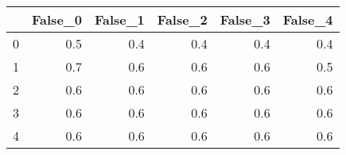 \begin{tabular}{lrrrrr}
\toprule
{} &  False\_0 &  False\_1 &  False\_2 &  False\_3 &  False\_4 \\ \hline
\midrule
0 &      0.5 &      0.4 &      0.4 &      0.4 &      0.4 \\ \hline
1 &      0.7 &      0.6 &      0.6 &      0.6 &      0.5 \\ \hline
2 &      0.6 &      0.6 &      0.6 &      0.6 &      0.6 \\ \hline
3 &      0.6 &      0.6 &      0.6 &      0.6 &      0.6 \\ \hline
4 &      0.6 &      0.6 &      0.6 &      0.6 &      0.6 \\ \hline
\bottomrule
\end{tabular}
